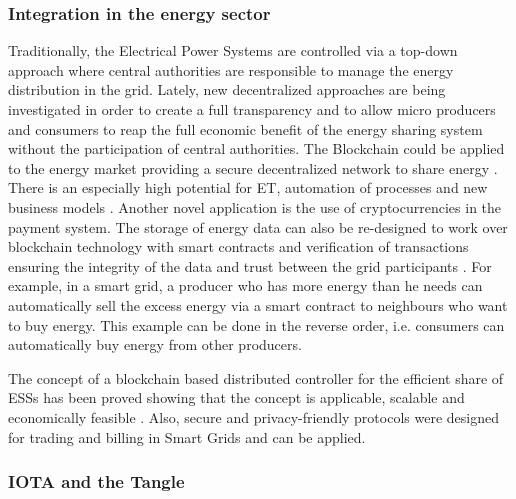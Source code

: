 \subsubsection{Integration in the energy sector}

Traditionally, the Electrical Power Systems are controlled via a top-down approach where central authorities are responsible to manage the energy distribution in the grid. Lately, new decentralized approaches are being investigated in order to create a full transparency and to allow micro producers and consumers to reap the full economic benefit of the energy sharing system without the participation of central authorities. The Blockchain could be applied to the energy market providing a secure decentralized network to share energy \cite{Hasse2016}. There is an especially high potential for \ac{ET}, automation of processes and new business models \cite{UseCasesforBlockchainTechnologyinEnergyCommodityTrading}. Another novel application is the use of cryptocurrencies in the payment system. The storage of energy data can also be re-designed to work over blockchain technology with smart contracts and verification of transactions ensuring the integrity of the data and trust between the grid participants \cite{ETHome:Opensourceblockchainbasedenergycommunitycontroller}. For example, in a smart grid, a producer who has more energy than he needs can automatically sell the excess energy via a smart contract to neighbours who want to buy energy. This example can be done in the reverse order, i.e. consumers can automatically buy energy from other producers.


 The concept of a blockchain based distributed controller for the efficient share of \acp{ESS}  has been proved showing that the concept is applicable, scalable and economically feasible \cite{ETHome:Opensourceblockchainbasedenergycommunitycontroller}. Also, secure and privacy-friendly protocols were designed for trading and billing in Smart Grids \cite{SecureandPrivacy-FriendlyLocalElectricityTradingandBillinginSmartGrid} and can be applied. 

\subsubsection{IOTA and the Tangle}
\label{seciotatech}


